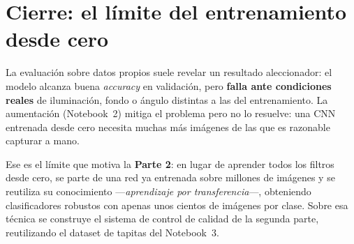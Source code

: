 \section{Cierre: el límite del entrenamiento desde cero}\label{sec:cierre}

La evaluación sobre datos propios suele revelar un resultado aleccionador: el modelo
alcanza buena \emph{accuracy} en validación, pero \textbf{falla ante condiciones reales}
de iluminación, fondo o ángulo distintas a las del entrenamiento. La aumentación
(Notebook~2) mitiga el problema pero no lo resuelve: una CNN entrenada desde cero necesita
muchas más imágenes de las que es razonable capturar a mano.

Ese es el límite que motiva la \textbf{Parte 2}: en lugar de aprender todos los filtros
desde cero, se parte de una red ya entrenada sobre millones de imágenes y se reutiliza su
conocimiento ---\emph{aprendizaje por transferencia}---, obteniendo clasificadores robustos
con apenas unos cientos de imágenes por clase. Sobre esa técnica se construye el sistema de
control de calidad de la segunda parte, reutilizando el dataset de tapitas del Notebook~3.
